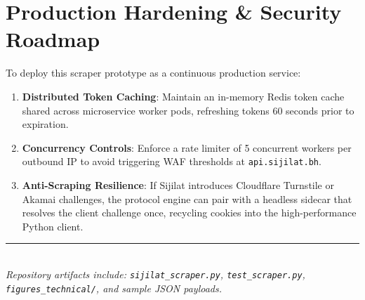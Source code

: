 \documentclass[11pt,a4paper]{article}
\begin{document}
\section{\color{techprimary}Production Hardening \& Security Roadmap}

To deploy this scraper prototype as a continuous production service:
\begin{enumerate}[leftmargin=1.5em]
    \item \textbf{Distributed Token Caching}: Maintain an in-memory Redis token cache shared across microservice worker pods, refreshing tokens 60 seconds prior to expiration.
    \item \textbf{Concurrency Controls}: Enforce a rate limiter of 5 concurrent workers per outbound IP to avoid triggering WAF thresholds at \texttt{api.sijilat.bh}.
    \item \textbf{Anti-Scraping Resilience}: If Sijilat introduces Cloudflare Turnstile or Akamai challenges, the protocol engine can pair with a headless sidecar that resolves the client challenge once, recycling cookies into the high-performance Python client.
\end{enumerate}

\vspace{1.0em}
\noindent\rule{\textwidth}{0.5pt}\\
\emph{Repository artifacts include: \texttt{sijilat\_scraper.py}, \texttt{test\_scraper.py}, \texttt{figures\_technical/}, and sample JSON payloads.}
\end{document}

